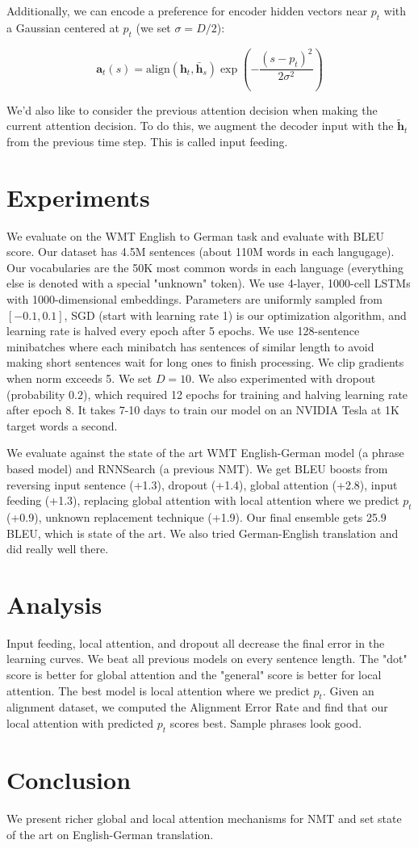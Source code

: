 \documentclass[a4paper]{article}
\begin{document}
Additionally, we can encode a preference for encoder hidden vectors near
$p_t$ with a Gaussian centered at $p_t$ (we set $\sigma = D/2$):

$$
\mathbf{a}_t(s) = \text{align}(\mathbf{h}_t, \mathbf{\bar{h}}_s)
\exp\left(- \frac{(s - p_t)^2}{2 \sigma^2}\right)
$$

We'd also like to consider the previous attention decision when making the
current attention decision. To do this, we augment the
decoder input with the $\mathbf{\tilde{h}}_t$ from the previous time step.
This is called input feeding.

\section{Experiments}
We evaluate on the WMT English to German task and evaluate with BLEU score.
Our dataset has 4.5M sentences (about 110M words in each langugage). Our
vocabularies are the 50K most common words in each language (everything else
is denoted with a special "unknown" token). We use 4-layer, 1000-cell LSTMs
with 1000-dimensional embeddings. Parameters are uniformly sampled from
$[-0.1, 0.1]$, SGD (start with learning rate 1) is our optimization algorithm,
and learning rate is halved every epoch after 5 epochs. We use 128-sentence
minibatches where each minibatch has sentences of similar length to avoid
making short sentences wait for long ones to finish processing. We clip
gradients when norm exceeds 5. We set $D = 10$. We also experimented
with dropout (probability $0.2$), which required 12 epochs for training and
halving learning rate after epoch 8. It takes 7-10 days to train our model
on an NVIDIA Tesla at 1K target words a second.

We evaluate against the state of the art WMT English-German model (a phrase
based model) and RNNSearch (a previous NMT). We get BLEU boosts from
reversing input sentence (+1.3), dropout (+1.4), global attention (+2.8),
input feeding (+1.3), replacing global attention with local attention where
we predict $p_t$ (+0.9), unknown replacement technique (+1.9). Our final
ensemble gets 25.9 BLEU, which is state of the art. We also tried
German-English translation and did really well there.

\section{Analysis}
Input feeding, local attention, and dropout all decrease the final error in
the learning curves. We beat all previous models on every sentence length.
The "dot" score is better for global attention and the "general" score is
better for local attention. The best model is local attention where we predict
$p_t$. Given an alignment dataset, we computed the Alignment Error Rate and
find that our local attention with predicted $p_t$ scores best. Sample
phrases look good.

\section{Conclusion}
We present richer global and local attention mechanisms for NMT and
set state of the art on English-German translation.
\end{document}
